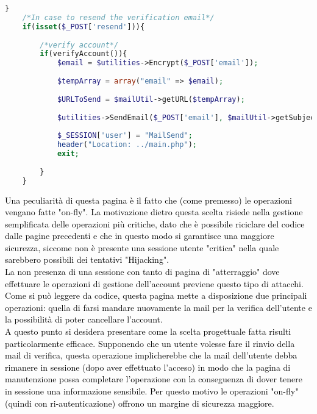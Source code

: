 \begin{lstlisting}[language=php]
	}
	/*In case to resend the verification email*/
	if(isset($_POST['resend'])){
		
		/*verify account*/
		if(verifyAccount()){
			$email = $utilities->Encrypt($_POST['email']);
			
			$tempArray = array("email" => $email);
			
			$URLToSend = $mailUtil->getURL($tempArray);
			
			$utilities->SendEmail($_POST['email'], $mailUtil->getSubject(), $mailUtil->getBody($URLToSend), $mailUtil->getAlternativeBody($URLToSend));
			
			$_SESSION['user'] = "MailSend";
			header("Location: ../main.php");
			exit;
			
		}
	}
\end{lstlisting}

\textcolor{black}{Una peculiarità di questa pagina è il fatto che (come premesso) le operazioni vengano fatte "on-fly". La motivazione dietro questa scelta risiede nella gestione semplificata delle operazioni più critiche, dato che è possibile riciclare del codice dalle pagine precedenti e che in questo modo si garantisce una maggiore sicurezza, siccome non è presente una sessione utente "critica" nella quale sarebbero possibili dei tentativi "Hijacking". \\
La non presenza di una sessione con tanto di pagina di "atterraggio" dove effettuare le operazioni di gestione dell'account previene questo tipo di attacchi.\\
Come si può leggere da codice, questa pagina mette a disposizione due principali operazioni: quella di farsi mandare nuovamente la mail per la verifica dell'utente e la possibilità di poter cancellare l'account.\\
A questo punto si desidera presentare come la scelta progettuale fatta risulti particolarmente efficace. Supponendo che un utente volesse fare il rinvio della mail di verifica, questa operazione implicherebbe che la mail dell'utente debba rimanere in sessione (dopo aver effettuato l'acceso) in modo che la pagina di manutenzione possa completare l'operazione con la conseguenza di dover tenere in sessione una informazione sensibile. Per questo motivo le operazioni "on-fly" (quindi con ri-autenticazione) offrono un margine di sicurezza maggiore.}\\